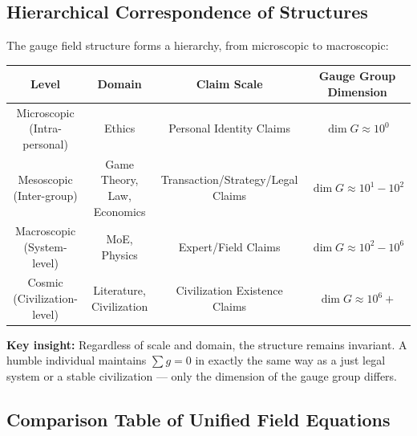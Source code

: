 \documentclass[12pt,a4paper]{article}
\theoremstyle{plain}
\theoremstyle{definition}
\begin{document}
\subsection{Hierarchical Correspondence of Structures}

The gauge field structure forms a hierarchy, from microscopic to macroscopic:

\begin{center}
\begin{tabular}{c|c|c|c}
    \toprule
    \textbf{Level} & \textbf{Domain} & \textbf{Claim Scale} & \textbf{Gauge Group Dimension} \\
    \midrule
    Microscopic (Intra-personal) & Ethics & Personal Identity Claims & $\dim G \approx 10^0$ \\
    Mesoscopic (Inter-group) & Game Theory, Law, Economics & Transaction/Strategy/Legal Claims & $\dim G \approx 10^1 - 10^2$ \\
    Macroscopic (System-level) & MoE, Physics & Expert/Field Claims & $\dim G \approx 10^2 - 10^6$ \\
    Cosmic (Civilization-level) & Literature, Civilization & Civilization Existence Claims & $\dim G \approx 10^6+$ \\
    \bottomrule
\end{tabular}
\end{center}

\textbf{Key insight:} Regardless of scale and domain, the structure remains invariant. A humble individual maintains
$\sum g = 0$ in exactly the same way as a just legal system or a stable civilization —
only the dimension of the gauge group differs.

\subsection{Comparison Table of Unified Field Equations}
\end{document}
